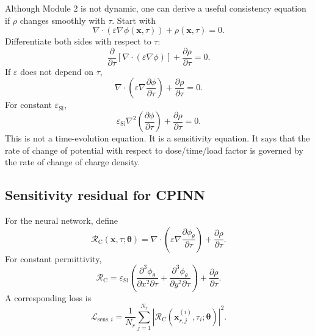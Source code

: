 \documentclass[11pt]{article}
\newcommand{\thetav}{\bm{\theta}}
\newcommand{\xv}{\bm{x}}
\newcommand{\epss}{\varepsilon_{\mathrm{Si}}}
\newcommand{\phinn}{\phi_{\theta}}
\newcommand{\Rcausal}{\mathcal{R}_{\mathrm{C}}}
\newcommand{\taud}{\tau}
\begin{document}
Although Module 2 is not dynamic, one can derive a useful consistency equation if $\rho$ changes smoothly with $\taud$. Start with
\begin{equation}
\nabla\cdot\left(\varepsilon\nabla\phi(\xv,\taud)\right)+\rho(\xv,\taud)=0.
\label{eq:poisson_tau}
\end{equation}
Differentiate both sides with respect to $\taud$:
\begin{equation}
\frac{\partial}{\partial\taud}\left[\nabla\cdot\left(\varepsilon\nabla\phi\right)\right]
+\frac{\partial\rho}{\partial\taud}=0.
\end{equation}
If $\varepsilon$ does not depend on $\taud$,
\begin{equation}
\nabla\cdot\left(\varepsilon\nabla\frac{\partial\phi}{\partial\taud}\right)
+\frac{\partial\rho}{\partial\taud}=0.
\label{eq:tau_sensitivity_poisson}
\end{equation}
For constant $\epss$,
\begin{equation}
\epss\nabla^2\left(\frac{\partial\phi}{\partial\taud}\right)
+\frac{\partial\rho}{\partial\taud}=0.
\label{eq:tau_sensitivity_constant_eps}
\end{equation}
This is not a time-evolution equation. It is a sensitivity equation. It says that the rate of change of potential with respect to dose/time/load factor is governed by the rate of change of charge density.

\subsection{Sensitivity residual for CPINN}

For the neural network, define
\begin{equation}
\Rcausal(\xv,\taud;\thetav)=
\nabla\cdot\left(\varepsilon\nabla\frac{\partial\phinn}{\partial\taud}\right)
+\frac{\partial\rho}{\partial\taud}.
\label{eq:ordered_consistency_residual}
\end{equation}
For constant permittivity,
\begin{equation}
\Rcausal=
\epss\left(
\frac{\partial^3\phinn}{\partial x^2\partial\taud}
+
\frac{\partial^3\phinn}{\partial y^2\partial\taud}
\right)+\frac{\partial\rho}{\partial\taud}.
\label{eq:ordered_consistency_residual_constant_eps}
\end{equation}
A corresponding loss is
\begin{equation}
\mathcal{L}_{\mathrm{sens},i}
=\frac{1}{N_r}\sum_{j=1}^{N_r}\left|\Rcausal(\xv_{r,j}^{(i)},\taud_i;\thetav)\right|^2.
\label{eq:sensitivity_loss}
\end{equation}
\end{document}
